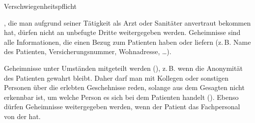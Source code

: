 \Text
{Verschwiegenheitspflicht}
{%
\label{topic:verschwiegenheitspflicht}
, die man aufgrund seiner
Tätigkeit als Arzt oder Sanitäter anvertraut bekommen
hat, dürfen nicht an unbefugte Dritte weitergegeben
werden.
{Geheimnisse} sind alle Informationen, die
einen Bezug zum Patienten haben oder liefern (z.\,B.
Name des Patienten, Versicherungsnummer, Wohnadresse,
{\dots}).

Geheimnisse  unter Umständen
mitgeteilt werden (), z.\,B.
 wenn die Anonymität des Patienten gewahrt bleibt. 
Daher darf man mit Kollegen oder sonstigen Personen
über die erlebten Geschehnisse reden, solange aus dem
Gesagten nicht erkennbar ist, um welche Person es sich
bei dem Patienten handelt ().
Ebenso dürfen Geheimnisse weitergegeben werden, wenn der
Patient das Fachpersonal von der  hat.
}
{}
{}
{}
{}

